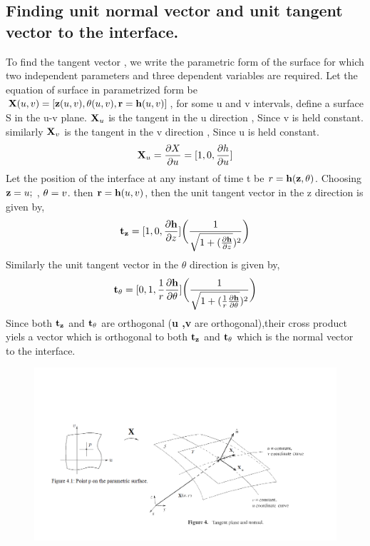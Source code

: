 \documentclass{article}
\begin{document}
\subsection{Finding unit normal vector and unit tangent vector to the interface.}
To find the tangent vector , we write the parametric form of the surface for which two independent parameters and three dependent variables are required.\newline
Let the equation of surface in parametrized form be  ${\bf X}(u,v) = [{\bf z}(u,v), {\bf \theta }(u,v), {\bf r = h}(u,v)]$, for some u and v intervals, define a surface S in the u-v plane. ${\bf X}_{u}$ is the tangent in the u direction , Since v is held constant.
similarly ${\bf X}_{v}$ is the tangent in the v direction , Since u is held constant.\newline
\begin{equation*}
{\bf X}_{u} = \frac{\partial X}{\partial u} = [{1 , 0 , \frac{\partial h}{\partial u}}]
\end{equation*}
\newline
Let the position of the interface at any instant of time t be $ r = {\bf h( z,\theta )}$.\newline
Choosing $ {\bf z} = u;$ ,  ${\bf \theta } = v $. then  $ {\bf r} = {\bf h}(u,v)$, then the unit tangent vector in the z direction is given by,
\begin{equation}
{\bf t_{z}} = [{1 , 0 , \frac{\partial {\bf h}}{\partial z}}]\bigg(\frac{1}{\sqrt{1 + (\frac{\partial {\bf h}}{\partial z}})^2}\bigg)
\end{equation}
Similarly the unit tangent vector in the $\theta $ direction is given by,
\begin{equation}
{\bf t_{\theta }} = [{0 , 1 , \frac{1}{r}\frac{\partial {\bf h}}{\partial \theta }}]\bigg(\frac{1}{\sqrt{1 + (\frac{1}{r}\frac{\partial {\bf h}}{\partial \theta }})^2}\bigg)
\end{equation}
Since both $ {\bf t_{z}}$ and ${\bf t_{\theta }}$ are orthogonal ({\bf u ,v} are orthogonal),their cross product yiels a vector which is orthogonal to both  $ {\bf t_{z}}$ and ${\bf t_{\theta }}$ which is the normal vector to the interface.

\begin{figure}[H] 
  \includegraphics[width=6.0in]{tangentplane.png}
\end{figure}
\end{document}
